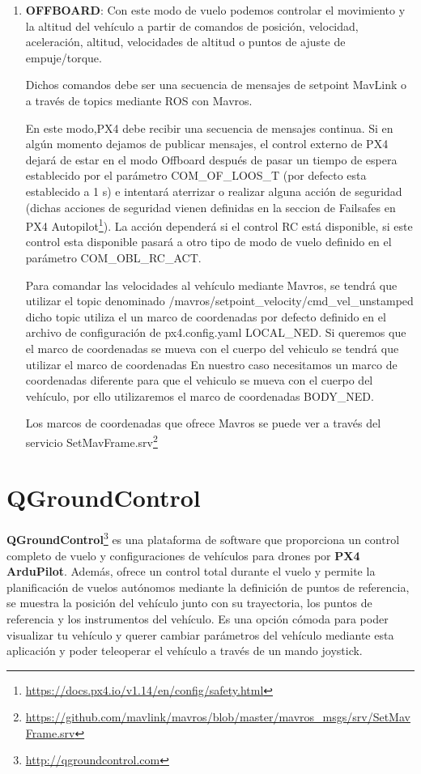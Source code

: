 \begin{enumerate}
    \item \textbf{OFFBOARD}: Con este modo de vuelo podemos controlar el movimiento y la altitud del vehículo a partir de comandos de posición, velocidad, aceleración, altitud, velocidades de 
    altitud o puntos de ajuste de empuje/torque. 

    Dichos comandos debe ser una secuencia de mensajes de setpoint MavLink o a través de topics mediante ROS con Mavros.

    En este modo,PX4 debe recibir una secuencia de mensajes continua. Si en algún momento dejamos de publicar mensajes, el control externo de PX4 dejará de estar en el modo Offboard después
    de pasar un tiempo de espera establecido por el parámetro COM\_OF\_LOOS\_T (por defecto esta establecido a 1 s) e intentará aterrizar o realizar alguna acción de seguridad (dichas acciones 
    de seguridad vienen definidas en la seccion de Failsafes en PX4 Autopilot\footnote{\url{https://docs.px4.io/v1.14/en/config/safety.html}}). La acción dependerá
    si el control RC está disponible, si este control esta disponible pasará a otro tipo de modo de vuelo definido en el parámetro COM\_OBL\_RC\_ACT. 

    Para comandar las velocidades al vehículo mediante Mavros, se tendrá que utilizar el topic denominado /mavros/setpoint\_velocity/cmd\_vel\_unstamped dicho topic utiliza el un marco de coordenadas
    por defecto definido en el archivo de configuración de px4.config.yaml  LOCAL\_NED. Si queremos que el marco de coordenadas se mueva con el 
    cuerpo del vehiculo se tendrá que utilizar el marco de coordenadas
    En nuestro caso necesitamos un marco de coordenadas diferente para que el vehiculo se mueva
    con el cuerpo del vehículo, por ello utilizaremos el marco de coordenadas BODY\_NED. 

    Los marcos de coordenadas que ofrece Mavros se puede ver a través del servicio SetMavFrame.srv\footnote{\url{https://github.com/mavlink/mavros/blob/master/mavros_msgs/srv/SetMavFrame.srv}}
  \end{enumerate}

\section{QGroundControl}
\label{sec:QGroundControl} 

\textbf{QGroundControl}\footnote{\url{http://qgroundcontrol.com}} es una plataforma de software que proporciona un control completo de vuelo 
y configuraciones de vehículos para drones por \textbf{PX4 ArduPilot}. Además, ofrece un control total durante el vuelo y permite la planificación de vuelos autónomos 
mediante la definición de puntos de referencia, se muestra la posición del vehículo junto con su trayectoria, los puntos de referencia y los instrumentos del vehículo. 
Es una opción cómoda para poder visualizar tu vehículo y querer cambiar parámetros del vehículo mediante esta aplicación y poder teleoperar el vehículo a través de un mando joystick. \newline

